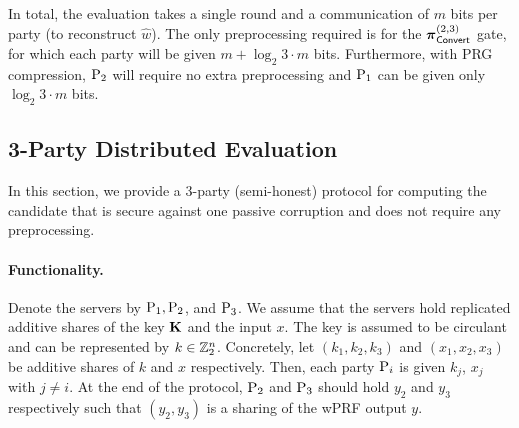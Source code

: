 In total, the evaluation takes a single round and a communication of $m$ bits per party (to reconstruct $\hat{w}$). The only preprocessing required is for the $\boldsymbol{\pi}_{\textnormal{\textsf{Convert}}}^{(2,3)}$ gate, for which each party will be given $m + \log_2{3} \cdot m$ bits. Furthermore, with PRG compression, $\textnormal{P}_2$ will require no extra preprocessing and $\textnormal{P}_1$ can be given only $\log_2{3} \cdot m$ bits.



\subsection{3-Party Distributed Evaluation}
\label{subsec:3party_protocol}

In this section, we provide a 3-party (semi-honest) protocol for computing the \ttwPRF candidate that is secure against one passive corruption and does not require any preprocessing.

\paragraph{Functionality.}
Denote the servers by $\textnormal{P}_1, \textnormal{P}_2$, and $\textnormal{P}_3$. We assume that the servers hold replicated additive shares of the key $\mat{K}$ and the input $x$. The key is assumed to be circulant and can be represented by $k \in \mathbb{Z}_2^n$. Concretely, let $(k_1, k_2, k_3)$ and $(x_1,x_2,x_3)$ be additive shares of $k$ and $x$ respectively. Then, each party $\textnormal{P}_i$ is given $k_j$, $x_j$ with $j \neq i$. At the end of the protocol, $\textnormal{P}_2$ and $\textnormal{P}_3$ should hold $y_2$ and $y_3$ respectively such that $(y_2, y_3)$ is a sharing of the wPRF output $y$.

